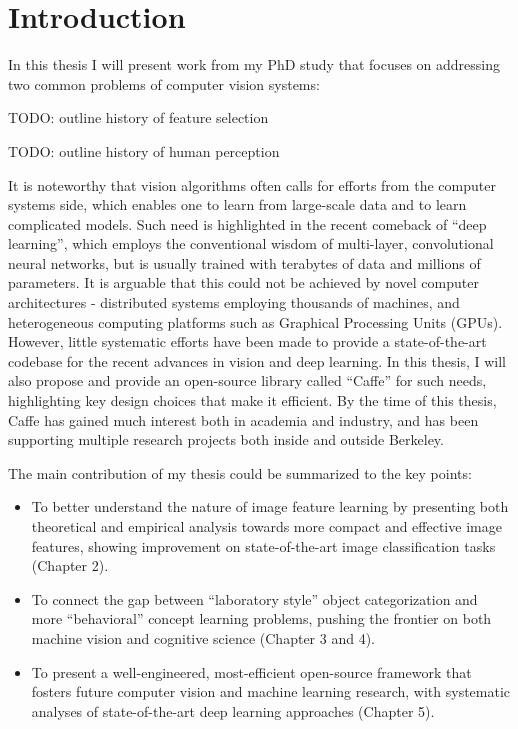 \chapter{Introduction}

In this thesis I will present work from my PhD study that focuses on addressing two common problems of computer vision systems: 

TODO: outline history of feature selection

TODO: outline history of human perception

It is noteworthy that vision algorithms often calls for efforts from the computer systems side, which enables one to learn from large-scale data and to learn complicated models. Such need is highlighted in the recent comeback of ``deep learning'', which employs the conventional wisdom of multi-layer, convolutional neural networks, but is usually trained with terabytes of data and millions of parameters. It is arguable that this could not be achieved by novel computer architectures - distributed systems employing thousands of machines, and heterogeneous computing platforms such as Graphical Processing Units (GPUs). However, little systematic efforts have been made to provide a state-of-the-art codebase for the recent advances in vision and deep learning. In this thesis, I will also propose and provide an open-source library called ``Caffe'' for such needs, highlighting key design choices that make it efficient. By the time of this thesis, Caffe has gained much interest both in academia and industry, and has been supporting multiple research projects both inside and outside Berkeley.

The main contribution of my thesis could be summarized to the key points:

\begin{itemize}
    \item To better understand the nature of image feature learning by presenting both theoretical and empirical analysis towards more compact and effective image features, showing improvement on state-of-the-art image classification tasks (Chapter 2).
    \item To connect the gap between ``laboratory style'' object categorization and more ``behavioral'' concept learning problems, pushing the frontier on both machine vision and cognitive science (Chapter 3 and 4).
    \item To present a well-engineered, most-efficient open-source framework that fosters future computer vision and machine learning research, with systematic analyses of state-of-the-art deep learning approaches (Chapter 5).
\end{itemize}

